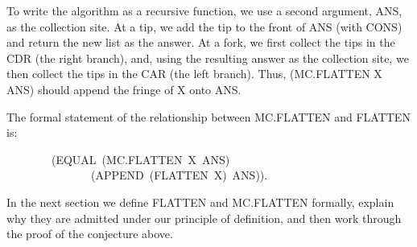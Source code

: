 \documentclass[10pt]{book}
\newenvironment{pubasis}{\begin{flushleft}}{\end{flushleft}}
\begin{document}
To write the algorithm as a recursive function, we
use a second argument, ANS, as the collection site.  At a tip, we add the tip to the front of
ANS (with CONS) and return the new list as the answer.  At a fork, we first
collect the tips in the CDR (the right branch), and, using the resulting answer
as the collection site,
we then collect the tips in the CAR (the left
branch).  Thus, (MC.FLATTEN X ANS) should
append the fringe of X onto ANS.

The formal statement of the relationship between MC.FLATTEN and FLATTEN
is:
\begin{pubasis}
~~~~~~~~(EQUAL~(MC.FLATTEN~X~ANS)\\
~~~~~~~~~~~~~~~(APPEND~(FLATTEN~X)~ANS)).\\
\end{pubasis}
In the next section we define FLATTEN and MC.FLATTEN
formally, explain why they are admitted under our principle of definition,
and then work through the proof of the conjecture above.
\end{document}
